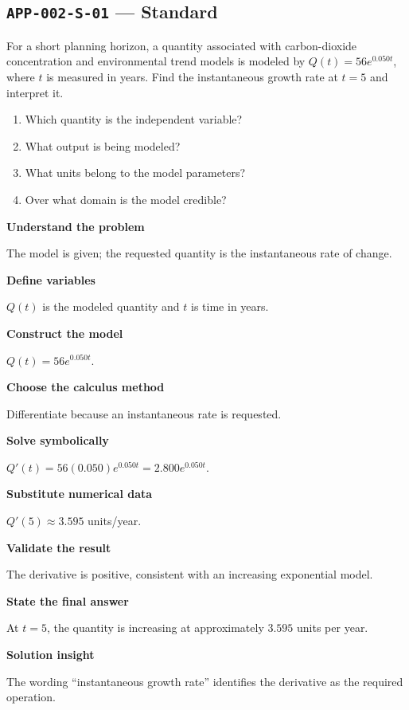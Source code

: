 \documentclass[11pt]{book}
\newcommand{\pid}[1]{\texttt{#1}}
\begin{document}
\subsection*{\pid{APP-002-S-01} — Standard}
\begin{problembox}
For a short planning horizon, a quantity associated with carbon-dioxide concentration and environmental trend models is modeled by $Q(t)=56e^{0.050t}$, where $t$ is measured in years. Find the instantaneous growth rate at $t=5$ and interpret it.
\end{problembox}
\begin{promptbox}\begin{enumerate}
\item Which quantity is the independent variable?
\item What output is being modeled?
\item What units belong to the model parameters?
\item Over what domain is the model credible?
\end{enumerate}\end{promptbox}
\begin{solutionbox}
\textbf{Understand the problem}\par The model is given; the requested quantity is the instantaneous rate of change.\par\medskip
\textbf{Define variables}\par $Q(t)$ is the modeled quantity and $t$ is time in years.\par\medskip
\textbf{Construct the model}\par $Q(t)=56e^{0.050t}$.\par\medskip
\textbf{Choose the calculus method}\par Differentiate because an instantaneous rate is requested.\par\medskip
\textbf{Solve symbolically}\par $Q'(t)=56(0.050)e^{0.050t}=2.800e^{0.050t}$.\par\medskip
\textbf{Substitute numerical data}\par $Q'(5)\approx 3.595$ units/year.\par\medskip
\textbf{Validate the result}\par The derivative is positive, consistent with an increasing exponential model.\par\medskip
\textbf{State the final answer}\par At $t=5$, the quantity is increasing at approximately $3.595$ units per year.\par\medskip
\textbf{Solution insight}\par The wording “instantaneous growth rate” identifies the derivative as the required operation.\par\medskip
\end{solutionbox}
\end{document}
